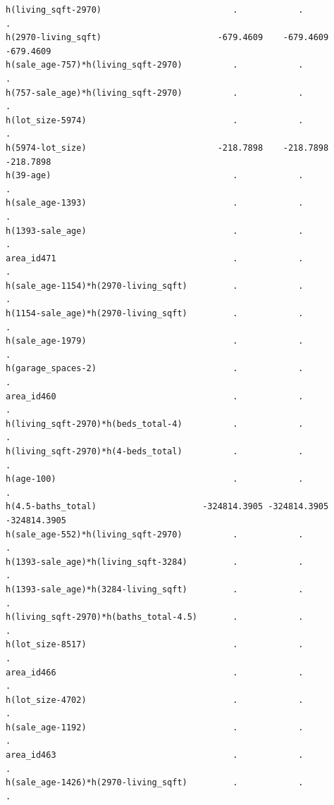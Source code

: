 \documentclass[
]{article}
\begin{document}
\begin{verbatim}
h(living_sqft-2970)                          .            .            .     
h(2970-living_sqft)                       -679.4609    -679.4609    -679.4609
h(sale_age-757)*h(living_sqft-2970)          .            .            .     
h(757-sale_age)*h(living_sqft-2970)          .            .            .     
h(lot_size-5974)                             .            .            .     
h(5974-lot_size)                          -218.7898    -218.7898    -218.7898
h(39-age)                                    .            .            .     
h(sale_age-1393)                             .            .            .     
h(1393-sale_age)                             .            .            .     
area_id471                                   .            .            .     
h(sale_age-1154)*h(2970-living_sqft)         .            .            .     
h(1154-sale_age)*h(2970-living_sqft)         .            .            .     
h(sale_age-1979)                             .            .            .     
h(garage_spaces-2)                           .            .            .     
area_id460                                   .            .            .     
h(living_sqft-2970)*h(beds_total-4)          .            .            .     
h(living_sqft-2970)*h(4-beds_total)          .            .            .     
h(age-100)                                   .            .            .     
h(4.5-baths_total)                     -324814.3905 -324814.3905 -324814.3905
h(sale_age-552)*h(living_sqft-2970)          .            .            .     
h(1393-sale_age)*h(living_sqft-3284)         .            .            .     
h(1393-sale_age)*h(3284-living_sqft)         .            .            .     
h(living_sqft-2970)*h(baths_total-4.5)       .            .            .     
h(lot_size-8517)                             .            .            .     
area_id466                                   .            .            .     
h(lot_size-4702)                             .            .            .     
h(sale_age-1192)                             .            .            .     
area_id463                                   .            .            .     
h(sale_age-1426)*h(2970-living_sqft)         .            .            .     
                                                                               

\end{verbatim}
\end{document}
